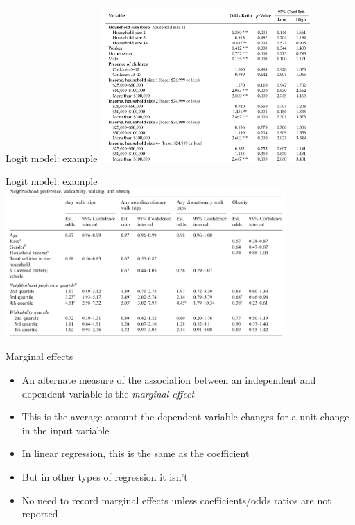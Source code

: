 \begin{frame}{Logit model: example}
  \centering\includegraphics[width=0.6\textwidth]{fig/conway_logit.png}\\
  {\tiny \textcite{conway_trends_2018}}
\end{frame}

\begin{frame}{Logit model: example}
  \centering\includegraphics[width=0.8\textwidth]{fig/frank_logit.png}\\
  {\tiny \textcite{frank_stepping_2007}}
\end{frame}

\begin{frame}{Marginal effects}
  \begin{itemize}
    \item An alternate measure of the association between an independent and dependent variable is the \emph{marginal effect}
    \item This is the average amount the dependent variable changes for a unit change in the input variable
    \item In linear regression, this is the same as the coefficient
    \item But in other types of regression it isn't
    \item No need to record marginal effects unless coefficients/odds ratios are not reported
  \end{itemize}
\end{frame}

